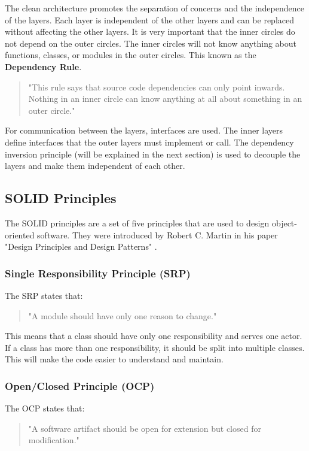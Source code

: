 \begin{spacing}{1.2}
    The clean architecture promotes the separation of concerns and the independence of the layers. Each layer is independent of the other layers and can be replaced without affecting the other layers.
    It is very important that the inner circles do not depend on the outer circles. The inner circles
    will not know anything about functions, classes, or modules in the outer circles. This known as
    the \textbf{Dependency Rule}.
    \begin{quote}
        "This rule says that source code dependencies can only point inwards. Nothing in an inner circle can know anything at all about something in an outer
        circle." \cite{cleanBlog}

    \end{quote}

    For communication between the layers, interfaces are used. The inner layers define interfaces that
    the outer layers must implement or call. The dependency inversion principle (will be explained in the next section) is used
    to decouple the layers and make them independent of each other.


    \subsection{SOLID Principles}
    The SOLID principles are a set of five principles that are used to design object-oriented software.
    They were introduced by Robert C. Martin in his paper "Design Principles and Design Patterns" \cite{martin2000design}.
    \subsubsection{Single Responsibility Principle (SRP)}
    The SRP states that:
    \begin{quote}
        "A module should have only one reason to change." \cite{clean}
    \end{quote}

    This means that a class should have only one responsibility and serves one actor. If a class
    has more than one responsibility, it should be split into multiple classes. This will make the
    code easier to understand and maintain.

    \subsubsection{Open/Closed Principle (OCP)}
    The OCP states that:
    \begin{quote}
        "A software artifact should be open for extension but closed for modification." \cite{meyer}
    \end{quote}


\end{spacing}
